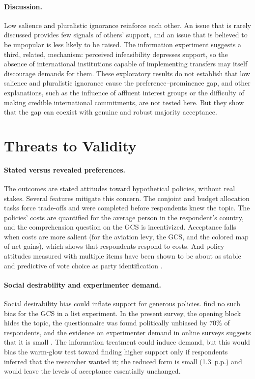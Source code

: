 \documentclass[12pt,english]{article}
\begin{document}
\paragraph{Discussion.} Low salience and pluralistic ignorance reinforce each other. An issue that is rarely discussed provides few signals of others' support, and an issue that is believed to be unpopular is less likely to be raised. The information experiment suggests a third, related, mechanism: perceived infeasibility depresses support, so the absence of international institutions capable of implementing transfers may itself discourage demands for them. These exploratory results do not establish that low salience and pluralistic ignorance cause the preference--prominence gap, and other explanations, such as the influence of affluent interest groups \citep{gilens_testing_2014} or the difficulty of making credible international commitments, are not tested here. But they show that the gap can coexist with genuine and robust majority acceptance.

\section{Threats to Validity}\label{sec:validity}

\paragraph{Stated versus revealed preferences.} The outcomes are stated attitudes toward hypothetical policies, without real stakes. Several features mitigate this concern. The conjoint and budget allocation tasks force trade-offs and were completed before respondents knew the topic. The policies' costs are quantified for the average person in the respondent's country, and the comprehension question on the GCS is incentivized. Acceptance falls when costs are more salient (for the aviation levy, the GCS, and the colored map of net gains), which shows that respondents respond to costs. And policy attitudes measured with multiple items have been shown to be about as stable and predictive of vote choice as party identification \citep{ansolabehere_strength_2008}.

\paragraph{Social desirability and experimenter demand.} Social desirability bias could inflate support for generous policies. \cite{fabre_majority_2025} find no such bias for the GCS in a list experiment. In the present survey, the opening block hides the topic, the questionnaire was found politically unbiased by 70\% of respondents, and the evidence on experimenter demand in online surveys suggests that it is small \citep{de_quidt_measuring_2018,mummolo_demand_2019}. The information treatment could induce demand, but this would bias the warm-glow test toward finding higher support only if respondents inferred that the researcher wanted it; the reduced form is small (1.3~p.p.) and would leave the levels of acceptance essentially unchanged.
\end{document}
